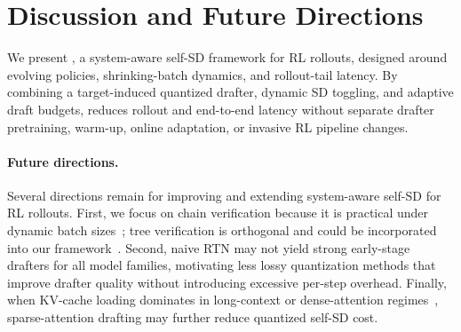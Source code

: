\section{Discussion and Future Directions}
\label{sec:discussion_future}

We present \methodtitle{}, a system-aware self-SD framework for RL rollouts, designed around evolving policies, shrinking-batch dynamics, and rollout-tail latency.
By combining a target-induced quantized drafter, dynamic SD toggling, and adaptive draft budgets, \methodtitle{} reduces rollout and end-to-end latency without separate drafter pretraining, warm-up, online adaptation, or invasive RL pipeline changes.

\paragraph{Future directions.}

Several directions remain for improving and extending system-aware self-SD for RL rollouts.
First, we focus on chain verification because it is practical under dynamic batch sizes~\citep{liu2025speculative}; tree verification is orthogonal and could be incorporated into our framework~\citep{li2024eagle,li2025eagle}.
Second, naive RTN may not yield strong early-stage drafters for all model families, motivating less lossy quantization methods that improve drafter quality without introducing excessive per-step overhead.
Finally, when KV-cache loading dominates in long-context or dense-attention regimes~\citep{cordonnier2020multi}, sparse-attention drafting may further reduce quantized self-SD cost.
